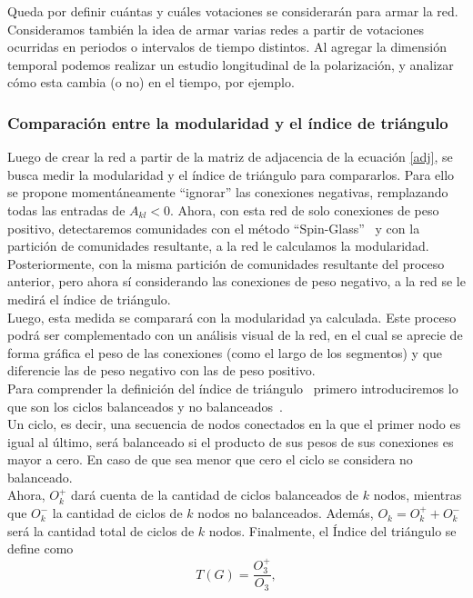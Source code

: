 \documentclass[hyperref]{proyectotesis}
\begin{document}
Queda por definir cuántas y cuáles votaciones se considerarán para armar la red. Consideramos también la idea de armar varias redes a partir de votaciones ocurridas en periodos o intervalos de tiempo distintos. Al agregar la dimensión temporal podemos realizar un estudio longitudinal de la polarización, y analizar cómo esta cambia (o no) en el tiempo, por ejemplo.

\subsubsection{Comparación entre la modularidad y el índice de triángulo} 
Luego de crear la red a partir de la matriz de adjacencia de la ecuación \eqref{adj}, se busca medir la modularidad y el índice de triángulo para compararlos. Para ello se propone momentáneamente ``ignorar'' las conexiones negativas, remplazando todas las entradas de $A_{kl} < 0$. Ahora, con esta red de solo conexiones de peso positivo, detectaremos comunidades con el método ``Spin-Glass''~\cite{reichardt_statistical_2006} y con la partición de comunidades resultante, a la red le calculamos la modularidad. \\

Posteriormente, con la misma partición de comunidades resultante del proceso anterior, pero ahora sí considerando las conexiones de peso negativo, a la red se le medirá el índice de triángulo. \\

Luego, esta medida se comparará con la modularidad ya calculada. Este proceso podrá ser complementado con un análisis visual de la red, en el cual se aprecie de forma gráfica el peso de las conexiones (como el largo de los segmentos) y que diferencie las de peso negativo con las de peso positivo.\\

Para comprender la definición del índice de triángulo~\cite{aref_measuring_2018} primero introduciremos lo que son los ciclos balanceados y no balanceados~\cite{aref_measuring_2018}.\\

Un ciclo, es decir, una secuencia de nodos conectados en la que el primer nodo es igual al último, será balanceado si el producto de sus pesos de sus conexiones es mayor a cero. En caso de que sea menor que cero el ciclo se considera no balanceado.\\

Ahora, $O_k^+$ dará cuenta de la cantidad de ciclos balanceados de $k$ nodos, mientras que $O_k^-$ la cantidad de ciclos de $k$ nodos no balanceados. Además, $O_k = O_k^+ + O_k^-$ será la cantidad total de ciclos de $k$ nodos. Finalmente, el Índice del triángulo se define como
\begin{equation}
    T(G) = \frac{O_3^+}{O_3},
\end{equation}
\end{document}
